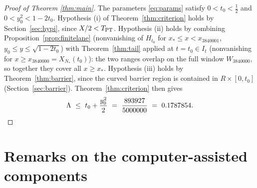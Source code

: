 \documentclass[11pt]{article}
\theoremstyle{definition}
\newcommand{\LB}{\Lambda}
\begin{document}
\begin{proof}[Proof of Theorem \ref{thm:main}]
The parameters \eqref{eq:params} satisfy $0<t_0<\frac12$ and
$0<y_0^2<1-2t_0$. Hypothesis (i) of Theorem~\ref{thm:criterion}
holds by Section~\ref{sec:hypi}, since $X/2<T_{\rm PT}$. Hypothesis
(ii) holds by combining Proposition~\ref{prop:finitelane}
(nonvanishing of $H_{t_0}$ for $x_*\le x<x_{3840001}$,
$y_0\le y\le\sqrt{1-2t_0}$) with Theorem~\ref{thm:tail} applied at
$t=t_0\in I_t$ (nonvanishing for $x\ge x_{3840000}=X_{N_*}(t_0)$):
the two ranges overlap on the full window $W_{3840000}$, so together
they cover all $x\ge x_*$. Hypothesis (iii) holds by
Theorem~\ref{thm:barrier}, since the curved barrier region is
contained in $R\times[0,t_0]$
(Section~\ref{sec:barrier}). Theorem~\ref{thm:criterion} then gives
\[
\LB\ \le\ t_0+\frac{y_0^2}{2}\ =\ \frac{893927}{5000000}
\ =\ 0.1787854 . \qedhere
\]
\end{proof}

\section{Remarks on the computer-assisted components}
\label{sec:gaps}
\end{document}
